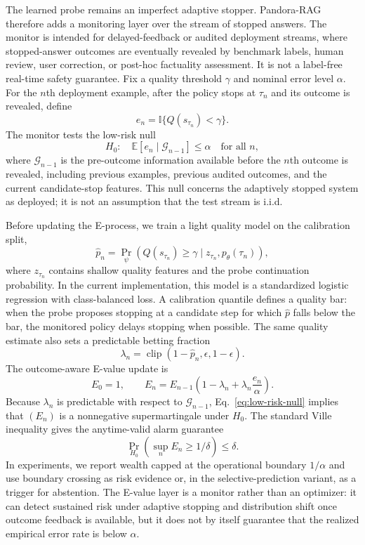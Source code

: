 \documentclass{article}
\newcommand{\method}{Pandora-RAG}
\begin{document}
The learned probe remains an imperfect adaptive stopper. \method{} therefore adds a monitoring layer over the stream of stopped answers. The monitor is intended for delayed-feedback or audited deployment streams, where stopped-answer outcomes are eventually revealed by benchmark labels, human review, user correction, or post-hoc factuality assessment. It is not a label-free real-time safety guarantee. Fix a quality threshold $\gamma$ and nominal error level $\alpha$. For the $n$th deployment example, after the policy stops at $\tau_n$ and its outcome is revealed, define
\[
  e_n=\mathbb{I}\{Q(s_{\tau_n})<\gamma\}.
\]
The monitor tests the low-risk null
\begin{equation}
  H_0:\quad
  \mathbb{E}[e_n\mid\mathcal{G}_{n-1}]\le \alpha
  \quad\text{for all }n,
  \label{eq:low-risk-null}
\end{equation}
where $\mathcal{G}_{n-1}$ is the pre-outcome information available before the $n$th outcome is revealed, including previous examples, previous audited outcomes, and the current candidate-stop features. This null concerns the adaptively stopped system as deployed; it is not an assumption that the test stream is i.i.d.

Before updating the E-process, we train a light quality model on the calibration split,
\[
  \hat p_n
  =
  \Pr_\psi\!\left(Q(s_{\tau_n})\ge\gamma
  \mid z_{\tau_n},p_\theta(\tau_n)\right),
\]
where $z_{\tau_n}$ contains shallow quality features and the probe continuation probability. In the current implementation, this model is a standardized logistic regression with class-balanced loss. A calibration quantile defines a quality bar: when the probe proposes stopping at a candidate step for which $\hat p$ falls below the bar, the monitored policy delays stopping when possible. The same quality estimate also sets a predictable betting fraction
\[
  \lambda_n=\operatorname{clip}(1-\hat p_n,\epsilon,1-\epsilon).
\]
The outcome-aware E-value update is
\begin{equation}
  E_0=1,\qquad
  E_n=E_{n-1}\left(1-\lambda_n+\lambda_n\frac{e_n}{\alpha}\right).
  \label{eq:evalue-update}
\end{equation}
Because $\lambda_n$ is predictable with respect to $\mathcal{G}_{n-1}$, Eq.~\eqref{eq:low-risk-null} implies that $(E_n)$ is a nonnegative supermartingale under $H_0$. The standard Ville inequality gives the anytime-valid alarm guarantee
\begin{equation}
  \Pr_{H_0}\left(\sup_n E_n\ge 1/\delta\right)\le \delta .
  \label{eq:ville}
\end{equation}
In experiments, we report wealth capped at the operational boundary $1/\alpha$ and use boundary crossing as risk evidence or, in the selective-prediction variant, as a trigger for abstention. The E-value layer is a monitor rather than an optimizer: it can detect sustained risk under adaptive stopping and distribution shift once outcome feedback is available, but it does not by itself guarantee that the realized empirical error rate is below $\alpha$.
\end{document}
